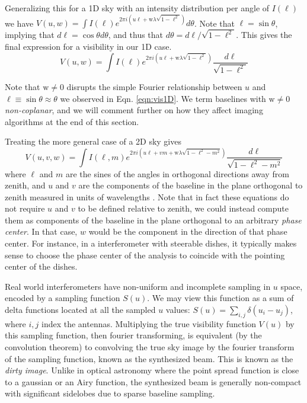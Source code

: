 {Generalizing this for a 1D sky with an intensity distribution per angle of $I(\ell)$ we have $V(u,w)=\int I(\ell)e^{2\pi i (u\ell+\text{w}\lambda\sqrt{1-\ell^2})}d\theta$. Note that $\ell=\sin\theta$, implying that $d\ell=\cos\theta d\theta$, and thus that $d\theta=d\ell/\sqrt{1-\ell^2}$. This gives the final expression for a visibility in our 1D case.
\begin{equation}
V(u,w)=\int I(\ell)e^{2\pi i (u\ell+\text{w}\lambda\sqrt{1-\ell^2})}\frac{d\ell}{\sqrt{1-\ell^2}}
\end{equation}

Note that $\text{w}\neq0$ disrupts the simple Fourier relationship between $u$ and $\ell\equiv\sin\theta\approx\theta$ we observed in Eqn. \ref{eqn:vis1D}. We term baselines with $\text{w}\neq0$ \textit{non-coplanar}, and we will comment further on how they affect imaging algorithms at the end of this section.

Treating the more general case of a 2D sky gives 
\begin{equation}
V(u,v,w)=\int I(\ell,m)e^{2\pi i (u\ell+vm+\text{w}\lambda\sqrt{1-\ell^2-m^2})}\frac{d\ell}{\sqrt{1-\ell^2-m^2}}
\end{equation}
where $\ell$ and $m$ are the sines of the angles in orthogonal directions away from zenith, and $u$ and $v$ are the components of the baseline in the plane orthogonal to zenith measured in units of wavelengths \citep{thompsonmoranswenson}. Note that in fact these equations do not require $u$ and $v$ to be defined relative to zenith, we could instead compute them as components of the baseline in the plane orthogonal to an arbitrary \textit{phase center}. In that case, $w$ would be the component in the direction of that phase center. For instance, in a interferometer with steerable dishes, it typically makes sense to choose the phase center of the analysis to coincide with the pointing center of the dishes. 

Real world interferometers have non-uniform and incomplete sampling in $u$ space, encoded by a sampling function $S(u)$. We may view this function as a sum of delta functions located at all the sampled $u$ values: $S(u)=\sum_{i,j}\delta(u_i-u_j)$, where $i,j$ index the antennas. Multiplying the true visibility function $V(u)$ by this sampling function, then fourier transforming, is equivalent (by the convolution theorem) to convolving the true sky image by the fourier transform of the sampling function, known as the synthesized beam. This is known as the \textit{dirty image}. Unlike in optical astronomy where the point spread function is close to a gaussian or an Airy function, the synthesized beam is generally non-compact with significant sidelobes due to sparse baseline sampling.  

}
